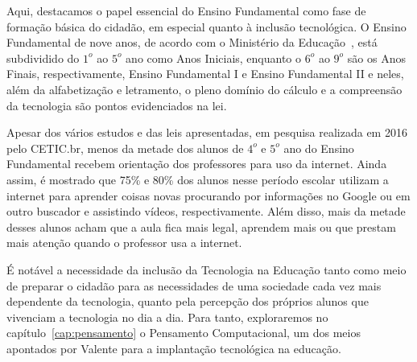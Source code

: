 Aqui, destacamos o papel essencial do Ensino Fundamental como fase de formação básica do cidadão, em especial quanto à inclusão tecnológica. O Ensino Fundamental de nove anos, de acordo com o Ministério da Educação~\cite{ministerio_da_educacao_ensino_2009}, está subdividido do $1^o$ ao $5^o$ ano como Anos Iniciais, enquanto o $6^o$ ao $9^o$ são os Anos Finais, respectivamente, Ensino Fundamental I e Ensino Fundamental II e neles, além da alfabetização e letramento, o pleno domínio do cálculo e a compreensão da tecnologia são pontos evidenciados na lei.

Apesar dos vários estudos e das leis apresentadas, em pesquisa realizada em 2016 pelo \acrfull{CETIC.br}, menos da metade dos alunos de $4^o$ e $5^o$ ano do Ensino Fundamental recebem orientação dos professores para uso da internet. Ainda assim, é mostrado que 75\% e 80\% dos alunos nesse período escolar utilizam a internet para aprender coisas novas procurando por informações no Google ou em outro buscador e assistindo vídeos, respectivamente. Além disso, mais da metade desses alunos acham que a aula fica mais legal, aprendem mais ou que prestam mais atenção quando o professor usa a internet.

É notável a necessidade da inclusão da Tecnologia na Educação tanto como meio de preparar o cidadão para as necessidades de uma sociedade cada vez mais dependente da tecnologia, quanto pela percepção dos próprios alunos que vivenciam a tecnologia no dia a dia. Para tanto, exploraremos no capítulo~\ref{cap:pensamento} o Pensamento Computacional, um dos meios apontados por Valente para a implantação tecnológica na educação.
